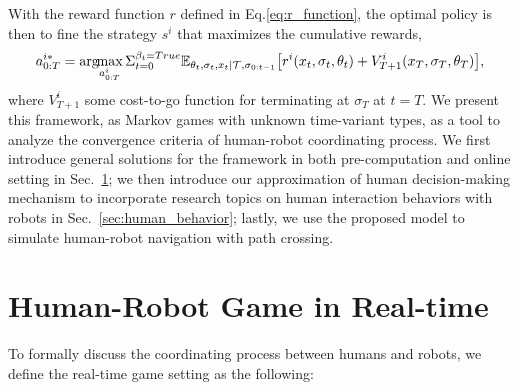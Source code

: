 \documentclass[letterpaper, 10 pt, conference]{ieeeconf}  %
\newcommand{\argmax}{\arg\!\!\max}
\begin{document}
With the reward function $r$ defined in Eq.\ref{eq:r_function}, the optimal 
policy is then to fine the strategy $s^i$ that maximizes the cumulative 
rewards,
\begin{equation}\label{eq:optimal}
  a^{i*}_{0:T} = \argmax_{a^i_{0:T}} 
  \Sigma_{t=0}^{\beta_t=True} 
  \mathbb{E}_{\theta_t,\sigma_{t},x_t|\mathcal{T},\sigma_{0:t-1}} \big{[}
  r^i(x_t,\sigma_t,\theta_t)+ V^i_{T+1}(x_T,\sigma_T,\theta_T)\big{]}, 
\end{equation}
where $V^i_{T+1}$ some cost-to-go function for terminating at $\sigma_T$ at 
$t=T$. 
We present this framework, as Markov games with unknown time-variant types,  
as a tool to analyze the convergence criteria of human-robot coordinating 
process. We first 
introduce general solutions for the framework in both pre-computation and 
online setting in Sec.~\ref{sec:realtime_game}; we then introduce our approximation of human 
decision-making mechanism to incorporate research topics on 
human interaction behaviors with robots in Sec.~\ref{sec:human_behavior}; 
lastly, we use the proposed model to simulate human-robot navigation with path 
crossing.



\section{Human-Robot Game in Real-time}\label{sec:realtime_game}
To formally discuss the coordinating process between humans and robots, we define the real-time game setting as the following: 
\end{document}
